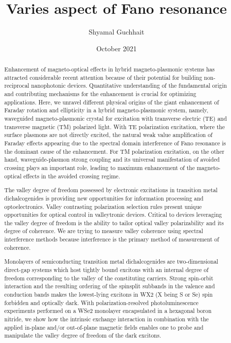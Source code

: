 \documentclass[13pt]{article}
\title{Varies aspect of Fano resonance}
\author{Shyamal Guchhait}
\date{October 2021}
\begin{document}
\maketitle

\begin{abstract}
    Enhancement of magneto-optical effects in hybrid magneto-plasmonic systems has attracted considerable recent attention because of their potential for building non-reciprocal nanophotonic devices. Quantitative understanding of the fundamental origin and contributing mechanisms for the enhancement is crucial for optimizing applications. Here, we unravel different physical origins of the giant enhancement of Faraday rotation and ellipticity in a hybrid magneto-plasmonic system, namely, waveguided magneto-plasmonic crystal for excitation with transverse electric (TE) and transverse magnetic (TM) polarized light. With TE polarization excitation, where the surface plasmons are not directly excited, the natural weak value amplification of Faraday effects appearing due to the spectral domain interference of Fano resonance is the dominant cause of the enhancement. For TM polarization excitation, on the other hand, waveguide-plasmon strong coupling and its universal manifestation of avoided crossing plays an important role, leading to maximum enhancement of the magneto-optical effects in the avoided crossing regime.
    \par
    The valley degree of freedom possessed by electronic excitations in transition metal dichalcogenides is providing new opportunities for information processing and optoelectronics. Valley contrasting polarization selection rules present unique opportunities for optical control in valleytronic devices. Critical to devices leveraging the valley degree of freedom is the ability to tailor optical valley polarizability and its degree of coherence. We are trying to measure valley coherence using spectral interference methods because interference is the primary method of measurement of coherence.
    \par 
    Monolayers of semiconducting transition metal dichalcogenides are two-dimensional direct-gap systems which host tightly bound excitons with an internal degree of freedom corresponding to the valley of the constituting carriers. Strong spin-orbit interaction and the resulting ordering of the spinsplit subbands in the valence and conduction bands makes the lowest-lying excitons in WX2 (X being S or Se) spin forbidden and optically dark. With polarization-resolved photoluminescence experiments performed on a WSe2 monolayer encapsulated in a hexagonal boron nitride, we show how the intrinsic exchange interaction in combination with the applied in-plane and/or out-of-plane magnetic fields enables one to probe and manipulate the valley degree of freedom of the dark excitons.
    
\end{abstract}
\end{document}
